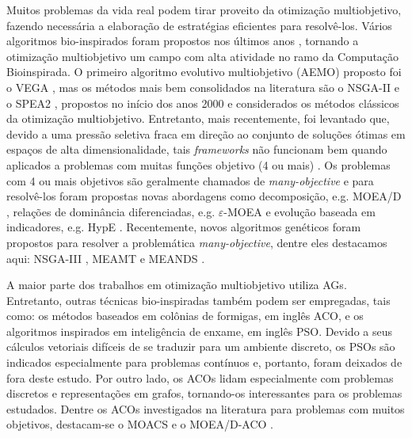 Muitos problemas da vida real podem tirar proveito da otimização multiobjetivo, fazendo necessária a elaboração de estratégias eficientes para resolvê-los. Vários algoritmos bio-inspirados foram propostos nos últimos anos \cite{Deb2002,Zitzler2002,Deb2014}, tornando a otimização multiobjetivo um campo com alta atividade no ramo da Computação Bioinspirada. O primeiro algoritmo evolutivo multiobjetivo (AEMO) proposto foi o \ac{VEGA} \cite{Schaffer1985}, mas os métodos mais bem consolidados na literatura são o NSGA-II \cite{Deb2002} e o SPEA2 \cite{Zitzler2002}, propostos no início dos anos 2000 e considerados os métodos clássicos da otimização multiobjetivo. Entretanto, mais recentemente, foi levantado que, devido a uma pressão seletiva fraca em direção ao conjunto de soluções ótimas em espaços de alta dimensionalidade, tais \textit{frameworks} não funcionam bem quando aplicados a problemas com muitas funções objetivo (4 ou mais) \cite{Deb2014}. Os problemas com 4 ou mais objetivos são geralmente chamados de \textit{many-objective} e para resolvê-los foram propostas novas abordagens como decomposição, e.g. MOEA/D \cite{Zhang2007}, relações de dominância diferenciadas, e.g. $\varepsilon$-MOEA \cite{Aguirre2009} e evolução baseada em indicadores, e.g. HypE \cite{Bader2011}. Recentemente, novos algoritmos genéticos foram propostos para resolver a problemática \textit{many-objective}, dentre eles destacamos aqui: NSGA-III \cite{Deb2014}, MEAMT \cite{Brasil2013} e MEANDS \cite{Lafeta2017}.

A maior parte dos trabalhos em otimização multiobjetivo utiliza \acp{AG}. Entretanto, outras técnicas bio-inspiradas também podem ser empregadas, tais como: os métodos baseados em colônias de formigas, em inglês \ac{ACO}, e os algoritmos inspirados em inteligência de enxame, em inglês \ac{PSO}. Devido a seus cálculos vetoriais difíceis de se traduzir para um ambiente discreto, os \acp{PSO} são indicados especialmente para problemas contínuos e, portanto, foram deixados de fora deste estudo. Por outro lado, os \acp{ACO} lidam especialmente com problemas discretos e representações em grafos, tornando-os interessantes para os problemas estudados. Dentre os ACOs investigados na literatura para problemas com muitos objetivos, destacam-se o MOACS \cite{Baran2003} e o MOEA/D-ACO \cite{Ke2013}.

